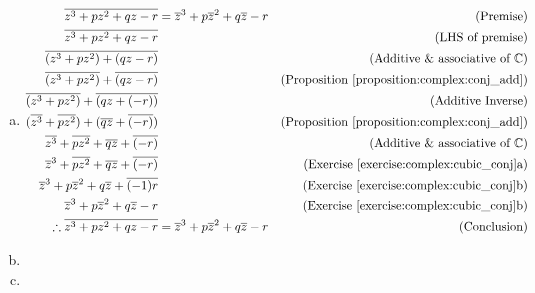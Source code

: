 \begin{enumerate}[(a)]
\item 
	\begin{align*}
	\overline{z^{3} + pz^{2} + qz - r} &= \overline{z}^{3} + p\overline{z}^{2} + q\overline{z} - r    &\text{(Premise)}\\
	\overline{z^{3} + pz^{2} + qz - r} & &\text{(LHS of premise)}\\
	\overline{(z^{3} + pz^{2}) + (qz - r)} & &\text{(Additive \& associative of}\ {\mathbb{C}})\\
	\overline{(z^{3} + pz^{2})} + \overline{(qz - r)} & &\text{(Proposition \ref{proposition:complex:conj_add})}\\
	\overline{(z^{3} + pz^{2})} + \overline{(qz + (-r))} & &\text{(Additive Inverse)}\\
	(\overline{z^{3}} + \overline{pz^{2}}) + (\overline{qz} + \overline{(-r)})& &\text{(Proposition \ref{proposition:complex:conj_add})}\\
	\overline{z^{3}} + \overline{pz^{2}} + \overline{qz} + \overline{(-r)}& &\text{(Additive \& associative of}\ {\mathbb{C}})\\
	\overline{z}^{3}+ \overline{pz^{2}} + \overline{qz} + \overline{(-r)}& &\text{(Exercise \ref{exercise:complex:cubic_conj}a)}\\
	\overline{z}^{3}+ p\overline{z}^{2} + q\overline{z} + \overline{(-1)r}& &\text{(Exercise \ref{exercise:complex:cubic_conj}b)}\\
	\overline{z}^{3}+ p\overline{z}^{2} + q\overline{z} - r& &\text{(Exercise \ref{exercise:complex:cubic_conj}b)}\\
	\therefore \overline{z^{3} + pz^{2} + qz - r} &= \overline{z}^{3} + p\overline{z}^{2} + q\overline{z} - r &\text{(Conclusion)}\\
	\end{align*}	
	
\item
\item
\end{enumerate}

